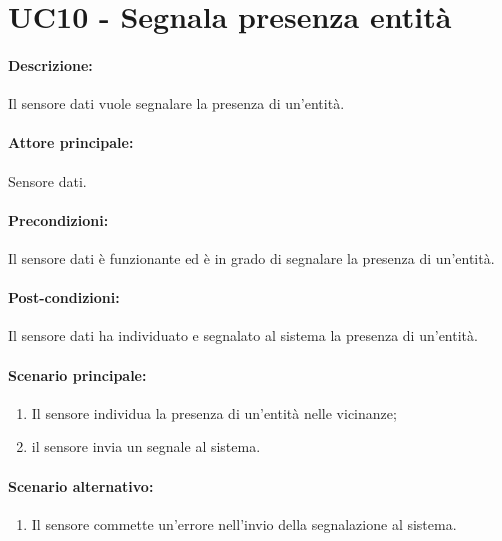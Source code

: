 \section{UC10 - Segnala presenza entità}

\paragraph{Descrizione:}
Il sensore dati vuole segnalare la presenza di un'entità.

\paragraph{Attore principale:}
Sensore dati.

\paragraph{Precondizioni:}
Il sensore dati è funzionante ed è in grado di segnalare la presenza di un'entità.

\paragraph{Post-condizioni:}
Il sensore dati ha individuato e segnalato al sistema la presenza di un'entità.

\paragraph{Scenario principale:}
\begin{enumerate}
    \item Il sensore individua la presenza di un'entità nelle vicinanze;
    \item il sensore invia un segnale al sistema.
\end{enumerate}

\paragraph{Scenario alternativo:}
\begin{enumerate}
    \item Il sensore commette un'errore nell'invio della segnalazione al sistema.
\end{enumerate}